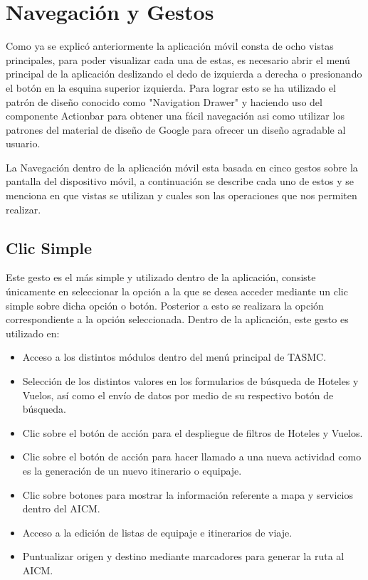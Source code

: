 \section{Navegación y Gestos}
Como ya se explicó anteriormente la aplicación móvil consta de ocho vistas principales, para poder visualizar cada una de estas, 
es necesario abrir el menú principal de la aplicación deslizando el dedo de izquierda a derecha o presionando el botón en la 
esquina superior izquierda. Para lograr esto se ha utilizado el patrón de diseño conocido como "Navigation Drawer" y haciendo uso
del componente Actionbar para obtener una fácil navegación asi como utilizar los patrones del material de diseño de Google para 
ofrecer un diseño agradable al usuario.

La Navegación dentro de la aplicación móvil esta basada en cinco gestos sobre la pantalla del dispositivo móvil, a continuación 
se describe cada uno de estos y se menciona en que vistas se utilizan y cuales son las operaciones que nos permiten realizar.

\subsection{Clic Simple}
Este gesto es el más simple y utilizado dentro de la aplicación, consiste únicamente en seleccionar la opción a la que se desea 
acceder mediante un clic simple sobre dicha opción o botón. Posterior a esto se realizara la opción correspondiente a la opción 
seleccionada. Dentro de la aplicación, este gesto es utilizado en: 

\begin{itemize}
 \item Acceso a los distintos módulos dentro del menú principal de TASMC.
 \item Selección de los distintos valores en los formularios de búsqueda de Hoteles y Vuelos, así como el envío de datos por medio 
 de su respectivo botón de búsqueda.
 \item Clic sobre el botón de acción para el despliegue de filtros de Hoteles y Vuelos.
 \item Clic sobre el botón de acción para hacer llamado a una nueva actividad como es la generación de un nuevo itinerario o equipaje.
 \item Clic sobre botones para mostrar la información referente a mapa y servicios dentro del AICM.
 \item Acceso a la edición de listas de equipaje e itinerarios de viaje.
 \item Puntualizar origen y destino mediante marcadores para generar la ruta al AICM.
\end{itemize}

